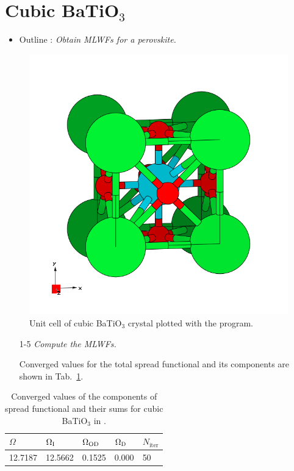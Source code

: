 \section{Cubic BaTiO$_3$}
\label{sec9:BaTiO3}

\begin{itemize}
	\item Outline : {\it Obtain MLWFs for a perovskite.}
\end{itemize}

\begin{figure}[h!]
\centering
\includegraphics[width=0.25\columnwidth,trim={45pt 45pt 55pt 55pt},clip]{figure/example09/BaTiO3.png}
\caption{Unit cell of cubic BaTiO$_3$ crystal plotted with the \xcrysden{} program.}
\label{fig9.0}
\end{figure}

\begin{itemize}
	\item[1-5] {\it Compute the MLWFs.}

	Converged values for the total spread functional and its components are shown in Tab.~\ref{tab9.1}.
\end{itemize}

\begin{table}[b!]
	\centering
	\captionsetup{width=.5\textwidth}
	\caption{Converged values of the components of spread functional and their sums for cubic BaTiO$_3$ in \angsqd{}.}
	\begin{tabular}{@{} lllll @{}}\toprule[1.5pt]
	$\Omega$ & $\Omega\tinysub{I}$ & $\Omega\tinysub{OD}$ & $\Omega\tinysub{D}$ & $N_{\mathrm{iter}}$ \\\midrule
	12.7187 & 12.5662 & 0.1525 &  0.000 & 50 \\\bottomrule[1pt]
	\end{tabular}\label{tab9.1}
\end{table}

